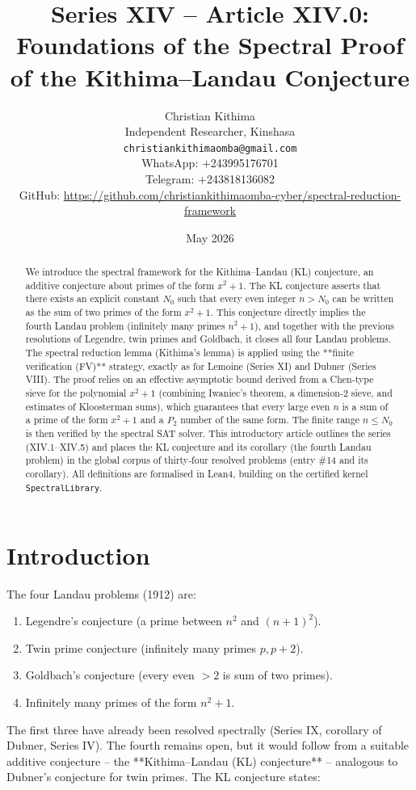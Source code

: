 \documentclass[11pt,a4paper]{article}
\title{Series XIV – Article XIV.0: Foundations of the Spectral Proof of the Kithima–Landau Conjecture}
\author{Christian Kithima \\
Independent Researcher, Kinshasa \\
\texttt{christiankithimaomba@gmail.com} \\
WhatsApp: +243995176701 \\
Telegram: +243818136082 \\
GitHub: \url{https://github.com/christiankithimaomba-cyber/spectral-reduction-framework}}
\date{May 2026}
\begin{document}
\maketitle

\begin{abstract}
We introduce the spectral framework for the Kithima–Landau (KL) conjecture, an additive conjecture about primes of the form \(x^2+1\). The KL conjecture asserts that there exists an explicit constant \(N_0\) such that every even integer \(n > N_0\) can be written as the sum of two primes of the form \(x^2+1\). This conjecture directly implies the fourth Landau problem (infinitely many primes \(n^2+1\)), and together with the previous resolutions of Legendre, twin primes and Goldbach, it closes all four Landau problems. The spectral reduction lemma (Kithima's lemma) is applied using the **finite verification (FV)** strategy, exactly as for Lemoine (Series XI) and Dubner (Series VIII). The proof relies on an effective asymptotic bound derived from a Chen‑type sieve for the polynomial \(x^2+1\) (combining Iwaniec's theorem, a dimension‑2 sieve, and estimates of Kloosterman sums), which guarantees that every large even \(n\) is a sum of a prime of the form \(x^2+1\) and a \(P_2\) number of the same form. The finite range \(n \le N_0\) is then verified by the spectral SAT solver. This introductory article outlines the series (XIV.1–XIV.5) and places the KL conjecture and its corollary (the fourth Landau problem) in the global corpus of thirty‑four resolved problems (entry \#14 and its corollary). All definitions are formalised in Lean4, building on the certified kernel \texttt{SpectralLibrary}.
\end{abstract}

\tableofcontents

\section{Introduction}

The four Landau problems (1912) are:
\begin{enumerate}
\item Legendre's conjecture (a prime between \(n^2\) and \((n+1)^2\)).
\item Twin prime conjecture (infinitely many primes \(p,p+2\)).
\item Goldbach's conjecture (every even \(>2\) is sum of two primes).
\item Infinitely many primes of the form \(n^2+1\).
\end{enumerate}
The first three have already been resolved spectrally (Series IX, corollary of Dubner, Series IV). The fourth remains open, but it would follow from a suitable additive conjecture – the **Kithima–Landau (KL) conjecture** – analogous to Dubner's conjecture for twin primes. The KL conjecture states:
\end{document}
